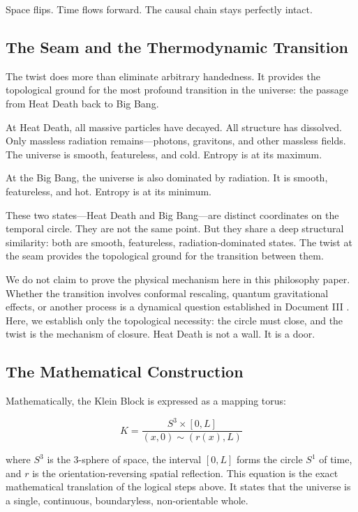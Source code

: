 \documentclass[11pt]{article}
\theoremstyle{canonstyle}
\providecommand{\Klein}{\mathcal{K}}
\providecommand{\Sone}{S^1}
\providecommand{\Sthree}{S^3}
\def\mathcal#1{#1}%
\begin{document}
Space flips. Time flows forward. The causal chain stays perfectly intact.

\subsection{The Seam and the Thermodynamic Transition}

The twist does more than eliminate arbitrary handedness. It provides the topological ground for the most profound transition in the universe: the passage from Heat Death back to Big Bang.

At Heat Death, all massive particles have decayed. All structure has dissolved. Only massless radiation remains---photons, gravitons, and other massless fields. The universe is smooth, featureless, and cold. Entropy is at its maximum.

At the Big Bang, the universe is also dominated by radiation. It is smooth, featureless, and hot. Entropy is at its minimum.

These two states---Heat Death and Big Bang---are distinct coordinates on the temporal circle. They are not the same point. But they share a deep structural similarity: both are smooth, featureless, radiation-dominated states. The twist at the seam provides the topological ground for the transition between them.

We do not claim to prove the physical mechanism here in this philosophy paper. Whether the transition involves conformal rescaling, quantum gravitational effects, or another process is a dynamical question established in Document III \cite{CanonHow}. Here, we establish only the topological necessity: the circle must close, and the twist is the mechanism of closure. Heat Death is not a wall. It is a door.

\subsection{The Mathematical Construction}

Mathematically, the Klein Block is expressed as a mapping torus:

\begin{equation}
\Klein = \frac{\Sthree \times [0, L]}{(x, 0) \sim (r(x), L)}
\end{equation}

where $\Sthree$ is the 3-sphere of space, the interval $[0,L]$ forms the circle $\Sone$ of time, and $r$ is the orientation-reversing spatial reflection. This equation is the exact mathematical translation of the logical steps above. It states that the universe is a single, continuous, boundaryless, non-orientable whole.
\end{document}
